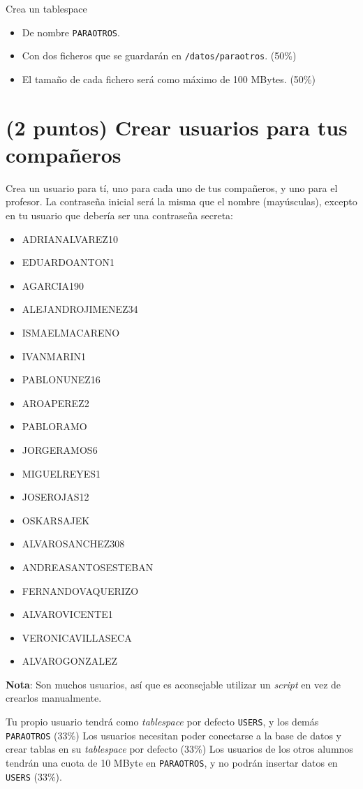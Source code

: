 \documentclass[a4paper]{article}
\begin{document}
Crea un tablespace
\begin{itemize}
\item De nombre \texttt{PARAOTROS}.
\item Con dos ficheros que se guardarán en \texttt{/datos/paraotros}. (50\%)
\item El tamaño de cada fichero será como máximo de 100 MBytes. (50\%)
\end{itemize}

\section{(2 puntos) Crear usuarios para tus compañeros}
\label{sec:org0000006}

Crea un usuario para tí, uno para cada uno de tus compañeros, y uno para el profesor. La contraseña inicial será la misma que el nombre (mayúsculas), excepto en tu usuario que debería ser una contraseña secreta:
\begin{multicols}{3}
\begin{itemize}
\item ADRIANALVAREZ10
\item EDUARDOANTON1
\item AGARCIA190
\item ALEJANDROJIMENEZ34
\item ISMAELMACARENO
\item IVANMARIN1
\item PABLONUNEZ16
\item AROAPEREZ2
\item PABLORAMO
\item JORGERAMOS6
\item MIGUELREYES1
\item JOSEROJAS12
\item OSKARSAJEK
\item ALVAROSANCHEZ308
\item ANDREASANTOSESTEBAN
\item FERNANDOVAQUERIZO
\item ALVAROVICENTE1
\item VERONICAVILLASECA
\item ALVAROGONZALEZ
\end{itemize}
\end{multicols}
\textbf{Nota}: Son muchos usuarios, así que es aconsejable utilizar un \emph{script} en vez de crearlos manualmente.

Tu propio usuario tendrá como \emph{tablespace} por defecto \texttt{USERS}, y los demás \texttt{PARAOTROS} (33\%)
Los usuarios necesitan poder conectarse a la base de datos y crear tablas en su \emph{tablespace} por defecto (33\%)
Los usuarios de los otros alumnos tendrán una cuota de 10 MByte en \texttt{PARAOTROS}, y no podrán insertar datos en \texttt{USERS} (33\%).
\end{document}

